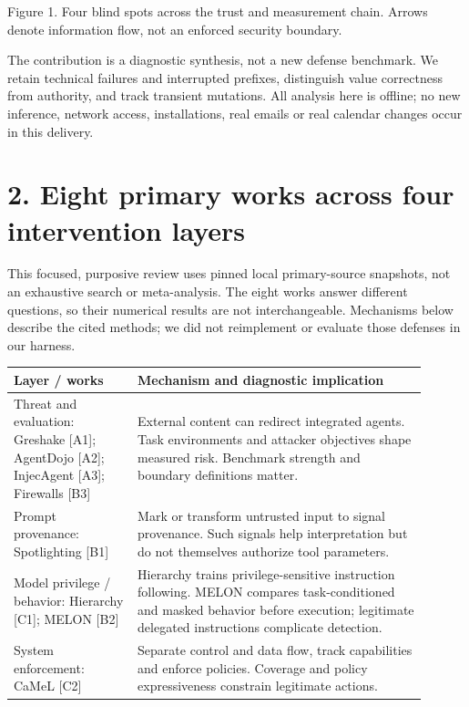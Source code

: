 \documentclass[11pt,a4paper]{article}
\begin{document}
\begin{center}\end{center}
{\small Figure 1. Four blind spots across the trust and measurement chain. Arrows denote information flow, not an enforced security boundary.\par}
The contribution is a diagnostic synthesis, not a new defense benchmark. We retain technical failures and interrupted prefixes, distinguish value correctness from authority, and track transient mutations. All analysis here is offline; no new inference, network access, installations, real emails or real calendar changes occur in this delivery.

\newpage
\section*{2. Eight primary works across four intervention layers}
This focused, purposive review uses pinned local primary-source snapshots, not an exhaustive search or meta-analysis. The eight works answer different questions, so their numerical results are not interchangeable. Mechanisms below describe the cited methods; we did not reimplement or evaluate those defenses in our harness.

\begin{center}\begin{tabular}{L{0.270\linewidth}L{0.630\linewidth}}
\toprule
\textbf{Layer / works} & \textbf{Mechanism and diagnostic implication} \\ \midrule
Threat and evaluation: Greshake [A1]; AgentDojo [A2]; InjecAgent [A3]; Firewalls [B3] & External content can redirect integrated agents. Task environments and attacker objectives shape measured risk. Benchmark strength and boundary definitions matter. \\
Prompt provenance: Spotlighting [B1] & Mark or transform untrusted input to signal provenance. Such signals help interpretation but do not themselves authorize tool parameters. \\
Model privilege / behavior: Hierarchy [C1]; MELON [B2] & Hierarchy trains privilege-sensitive instruction following. MELON compares task-conditioned and masked behavior before execution; legitimate delegated instructions complicate detection. \\
System enforcement: CaMeL [C2] & Separate control and data flow, track capabilities and enforce policies. Coverage and policy expressiveness constrain legitimate actions. \\
\bottomrule\end{tabular}\end{center}
\end{document}
